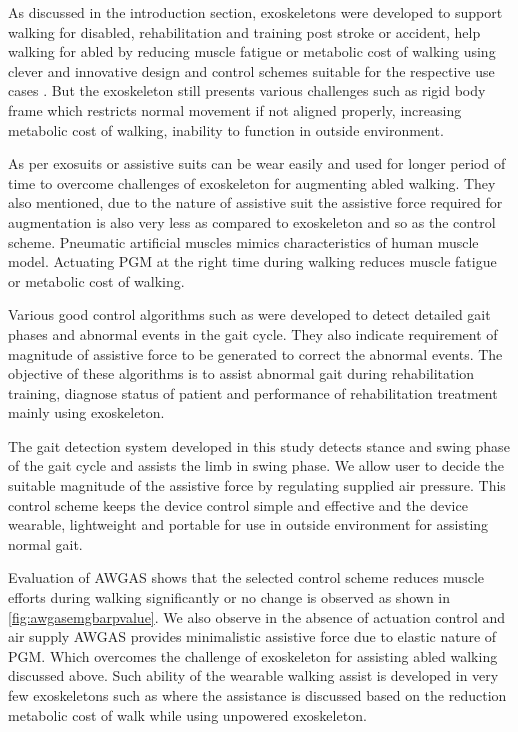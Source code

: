 \documentclass[paper,JRM,paper]{jaciiiarticle}
\begin{document}
As discussed in the introduction section, exoskeletons were developed to support walking for disabled, rehabilitation and training post stroke or accident, help walking for abled by reducing muscle fatigue or metabolic cost of walking using clever and innovative design and control schemes suitable for the respective use cases \cite{24}. But the exoskeleton still presents various challenges such as rigid body frame which restricts normal movement if not aligned properly, increasing metabolic cost of walking, inability to function in outside environment. 

As per \cite{25} exosuits or assistive suits can be wear easily and used for longer period of time to overcome challenges of exoskeleton for augmenting abled walking. They also mentioned, due to the nature of assistive suit the assistive force required for augmentation is also very less as compared to exoskeleton and so as the control scheme. Pneumatic artificial muscles mimics characteristics of human muscle model. Actuating PGM at the right time during walking reduces muscle fatigue or metabolic cost of walking.

Various good control algorithms such as \cite{26,27,28} were developed to detect detailed gait phases and abnormal events in the gait cycle. They also indicate requirement of magnitude of assistive force to be generated to correct the abnormal events. The objective of these algorithms is to assist abnormal gait during rehabilitation training, diagnose status of patient and performance of rehabilitation treatment mainly using exoskeleton. 

The gait detection system developed in this study detects stance and swing phase of the gait cycle and assists the limb in swing phase. We allow user to decide the suitable magnitude of the assistive force by regulating supplied air pressure. This control scheme keeps the device control simple and effective and the device wearable, lightweight and portable for use in outside environment for assisting normal gait. 

Evaluation of AWGAS shows that the selected control scheme reduces muscle efforts during walking significantly or no change is observed as shown in \ref{fig:awgasemgbarpvalue}. We also observe in the absence of actuation control and air supply AWGAS provides minimalistic assistive force due to elastic nature of PGM. Which overcomes the challenge of exoskeleton for assisting abled walking discussed above. Such ability of the wearable walking assist is developed in very few exoskeletons such as \cite{23} where the assistance is discussed based on the reduction metabolic cost of walk while using unpowered exoskeleton. 
\end{document}
